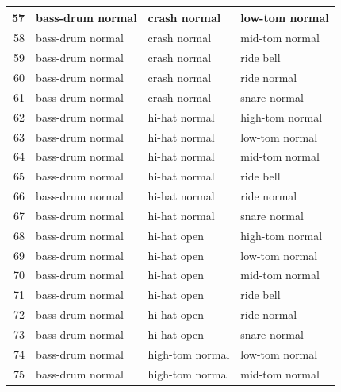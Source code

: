 \begin{appendices}
\begin{figure}[H]
\begin{tiny}
\begin{tabular}{r|l|l|l|}
                    \hline
                    57 & bass-drum normal & crash normal & low-tom normal \\
                    \hline
                    58 & bass-drum normal & crash normal & mid-tom normal \\
                    \hline
                    59 & bass-drum normal & crash normal & ride bell \\
                    \hline
                    60 & bass-drum normal & crash normal & ride normal \\
                    \hline
                    61 & bass-drum normal & crash normal & snare normal \\
                    \hline
                    62 & bass-drum normal & hi-hat normal & high-tom normal \\
                    \hline
                    63 & bass-drum normal & hi-hat normal & low-tom normal \\
                    \hline
                    64 & bass-drum normal & hi-hat normal & mid-tom normal \\
                    \hline
                    65 & bass-drum normal & hi-hat normal & ride bell \\
                    \hline
                    66 & bass-drum normal & hi-hat normal & ride normal \\
                    \hline
                    67 & bass-drum normal & hi-hat normal & snare normal \\
                    \hline
                    68 & bass-drum normal & hi-hat open & high-tom normal \\
                    \hline
                    69 & bass-drum normal & hi-hat open & low-tom normal \\
                    \hline
                    70 & bass-drum normal & hi-hat open & mid-tom normal \\
                    \hline
                    71 & bass-drum normal & hi-hat open & ride bell \\
                    \hline
                    72 & bass-drum normal & hi-hat open & ride normal \\
                    \hline
                    73 & bass-drum normal & hi-hat open & snare normal \\
                    \hline
                    74 & bass-drum normal & high-tom normal & low-tom normal \\
                    \hline
                    75 & bass-drum normal & high-tom normal & mid-tom normal \\

\end{tabular}
\end{tiny}
\end{figure}
\end{appendices}
